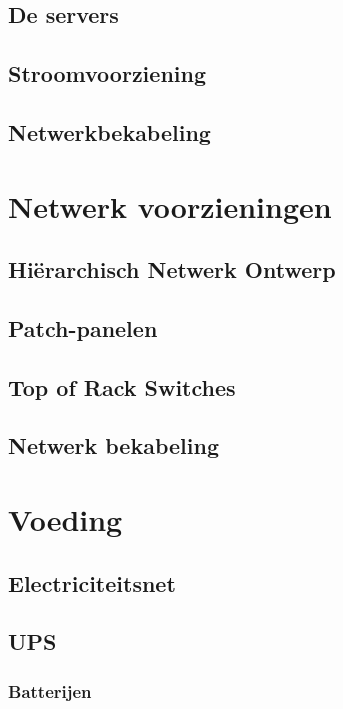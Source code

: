 \documentclass[a4paper,12pt,twoside,openright,titlepage]{book}
\begin{document}
\section{De servers}

\section{Stroomvoorziening}

\section{Netwerkbekabeling}


\chapter{Netwerk voorzieningen}
\section{Hi\"erarchisch Netwerk Ontwerp}

\section{Patch-panelen}

\section{Top of Rack Switches}

\section{Netwerk bekabeling}


\chapter{Voeding}

\section{Electriciteitsnet}

\section{UPS}

\subsection{Batterijen}

\end{document}
